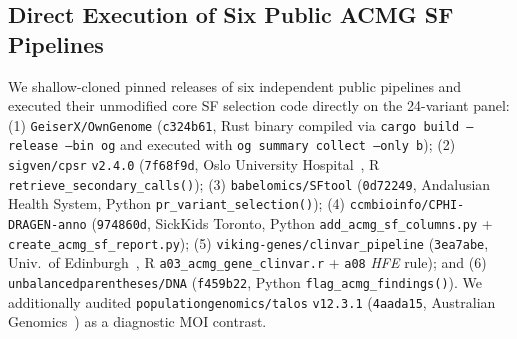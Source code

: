 \documentclass[11pt,letterpaper]{article}
\begin{document}
\subsection{Direct Execution of Six Public ACMG SF Pipelines}
We shallow-cloned pinned releases of six independent public pipelines and executed their unmodified core SF selection code directly on the 24-variant panel: (1) \texttt{GeiserX/OwnGenome} (\texttt{c324b61}, Rust binary compiled via \texttt{cargo build --release --bin og} and executed with \texttt{og summary collect --only b}); (2) \texttt{sigven/cpsr} \texttt{v2.4.0} (\texttt{7f68f9d}, Oslo University Hospital~\citep{nakken2021cpsr}, R \texttt{retrieve\_\allowbreak secondary\_\allowbreak calls()}); (3) \texttt{babelomics/SFtool} (\texttt{0d72249}, Andalusian Health System, Python \texttt{pr\_\allowbreak variant\_\allowbreak selection()}); (4) \texttt{ccmbioinfo/CPHI-DRAGEN-anno} (\texttt{974860d}, SickKids Toronto, Python \texttt{add\_\allowbreak acmg\_\allowbreak sf\_\allowbreak columns.py} + \texttt{create\_\allowbreak acmg\_\allowbreak sf\_\allowbreak report.py}); (5) \texttt{viking-genes/clinvar\_pipeline} (\texttt{3ea7abe}, Univ.\ of Edinburgh~\citep{kerr2025viking}, R \texttt{a03\_\allowbreak acmg\_\allowbreak gene\_\allowbreak clinvar.r} + \texttt{a08} \textit{HFE} rule); and (6) \texttt{unbalancedparentheses/DNA} (\texttt{f459b22}, Python \texttt{flag\_\allowbreak acmg\_\allowbreak findings()}). We additionally audited \texttt{populationgenomics/talos} \texttt{v12.3.1} (\texttt{4aada15}, Australian Genomics~\citep{welland2026talos}) as a diagnostic MOI contrast.
\end{document}
